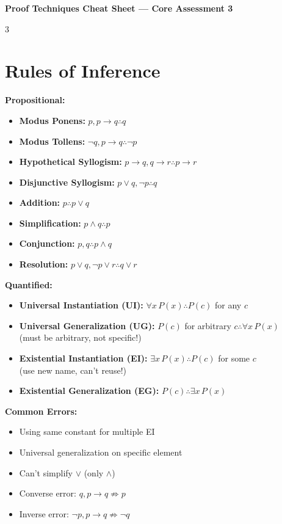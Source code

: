 \documentclass[8pt]{article}
\begin{document}
\begin{center}
\textbf{\large Proof Techniques Cheat Sheet --- Core Assessment 3}
\end{center}
\vspace{-6pt}

\begin{multicols}{3}
\small

\section*{Rules of Inference}
\textbf{Propositional:}
\begin{itemize}[nosep]
\item \textbf{Modus Ponens:} $p, p \to q \therefore q$
\item \textbf{Modus Tollens:} $\neg q, p \to q \therefore \neg p$
\item \textbf{Hypothetical Syllogism:} $p \to q, q \to r \therefore p \to r$
\item \textbf{Disjunctive Syllogism:} $p \lor q, \neg p \therefore q$
\item \textbf{Addition:} $p \therefore p \lor q$
\item \textbf{Simplification:} $p \land q \therefore p$
\item \textbf{Conjunction:} $p, q \therefore p \land q$
\item \textbf{Resolution:} $p \lor q, \neg p \lor r \therefore q \lor r$
\end{itemize}

\textbf{Quantified:}
\begin{itemize}[nosep]
\item \textbf{Universal Instantiation (UI):} $\forall x\, P(x) \therefore P(c)$ for any $c$
\item \textbf{Universal Generalization (UG):} $P(c)$ for arbitrary $c \therefore \forall x\, P(x)$
  \\ (must be arbitrary, not specific!)
\item \textbf{Existential Instantiation (EI):} $\exists x\, P(x) \therefore P(c)$ for some $c$
  \\ (use new name, can't reuse!)
\item \textbf{Existential Generalization (EG):} $P(c) \therefore \exists x\, P(x)$
\end{itemize}

\textbf{Common Errors:}
\begin{itemize}[nosep]
\item Using same constant for multiple EI
\item Universal generalization on specific element
\item Can't simplify $\lor$ (only $\land$)
\item Converse error: $q, p \to q \not\Rightarrow p$
\item Inverse error: $\neg p, p \to q \not\Rightarrow \neg q$
\end{itemize}
\newcolumn

\end{multicols}
\end{document}

